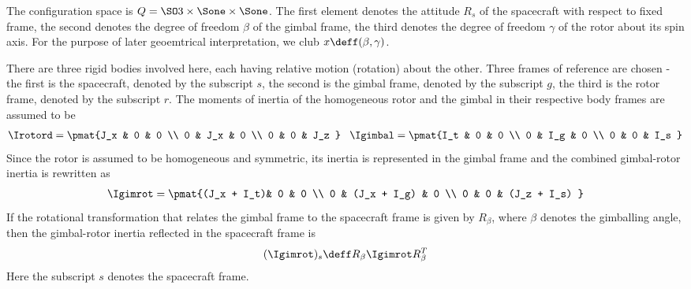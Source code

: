 \documentclass[11pt]{article}                %
\begin{document}
          The configuration space is $Q = \SO3 \times \Sone \times \Sone $. 
          The first element denotes the 
          attitude $R_s$ of the spacecraft with respect to fixed frame, the second denotes the degree of 
          freedom $\beta$ of the gimbal frame, the third denotes the degree of freedom 
          $\gamma$ of the 
          rotor about its  spin axis. For the purpose of later geoemtrical interpretation, we club
          $x \deff (\beta, \gamma)$.
          
          There are three rigid bodies involved here, 
          each having relative motion (rotation) about the other. Three frames of reference
          are chosen - the first is the 
          spacecraft, denoted by the subscript $s$, the second is the gimbal frame, denoted by the 
          subscript $g$, the third is the rotor frame, denoted by the subscript $r$.        %
          The moments of inertia of the homogeneous rotor and the gimbal in their respective 
          body frames are assumed to be
          \begin{align}
             \Irotord=  \pmat{J_x & 0 & 0 \\ 0 & J_x &  0  \\  0  &  0  & J_z } \;\;\;
             \Igimbal = \pmat{I_t & 0 & 0 \\ 0 & I_g &  0  \\  0  &  0  & I_s }
          \end{align}
            Since the rotor is 
          assumed to be homogeneous and symmetric, its inertia is represented in the gimbal frame  and
            the combined gimbal-rotor inertia is rewritten as     
          \begin{align}
                 \Igimrot= \pmat{(J_x + I_t)& 0 & 0 \\ 0 & (J_x + I_g) &  0  \\  0  &  0  & (J_z + I_s) }
          \end{align}
          If the rotational transformation that relates the gimbal frame to the spacecraft frame is 
          given by $R_{\beta}$, where
          $\beta$ denotes the gimballing angle,
          then the gimbal-rotor inertia reflected in the spacecraft frame is
           \begin{align}
          (\Igimrot)_s \deff R_{\beta}  \Igimrot R_{\beta}^T
           \end{align}
	     Here the subscript $s$ denotes the spacecraft frame.
\end{document}
